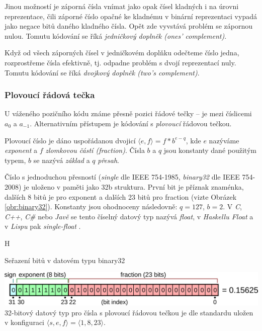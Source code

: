 Jinou možností je záporná čísla vnímat jako opak čísel kladných i na úrovni reprezentace, čili záporné číslo opačné ke kladnému v binární reprezentaci vypadá jako negace bitů daného kladného čísla. Opět zde vyvstává problém se zápornou nulou. Tomutu kódování se říká \textit{jedničkový doplněk (ones' complement)}.

Když od všech záporných čísel v jedničkovém doplňku odečteme číslo jedna, rozprostřeme čísla efektivně, tj. odpadne problém s dvojí reprezentací nuly. Tomutu kódování se říká \textit{dvojkový doplněk (two's complement)}.

\subsubsection{Plovoucí řádová tečka}
U váženého pozičního kódu známe přesně pozici řádové tečky -- je mezi číslicemi $a_0$ a $a_{-1}$. Alternativním přístupem je kódování s \textit{plovoucí} řádovou tečkou.

Plovoucí číslo je dáno uspořádanou dvojicí $\langle e,f\rangle = f * b^{e-q}$, kde $e$ nazýváme \textit{exponent} a $f$ \textit{zlomkovou částí (fraction)}. Čísla $b$ a $q$ jsou konstanty dané použitým typem, $b$ se nazývá \textit{základ} a $q$ \textit{přesah}.

\begin{example}
Číslo s jednoduchou přesností (\textit{single} dle IEEE 754-1985, \textit{binary32} dle IEEE 754-2008) je uloženo v paměti jako 32b struktura. První bit je příznak znaménka, dalších 8 bitů je pro exponent a dalších 23 bitů pro fraction (vizte Obrázek \ref{obr:binary32}). Konstanty jsou ohodnoceny následovně: $q=127$, $b=2$. V \textit{C}, \textit{C++}, \textit{C\#} nebo \textit{Javě} se tento číselný datový typ nazývá \textit{float}, v \textit{Haskellu Float} a v \textit{Lispu} pak \textit{single-float} \cite{wiki:float}.
\begin{myfigure}{H}
\caption{Seřazení bitů v datovém typu binary32 \cite{wiki:file:binary32}}
\includegraphics[width=\linewidth]{graphics/float.png}\label{obr:binary32}
32-bitový datový typ pro čísla s plovoucí řádovou tečkou je dle standardu uložen v konfiguraci $\langle s,e,f \rangle=\langle 1,8,23\rangle$.
\end{myfigure}
\end{example}

